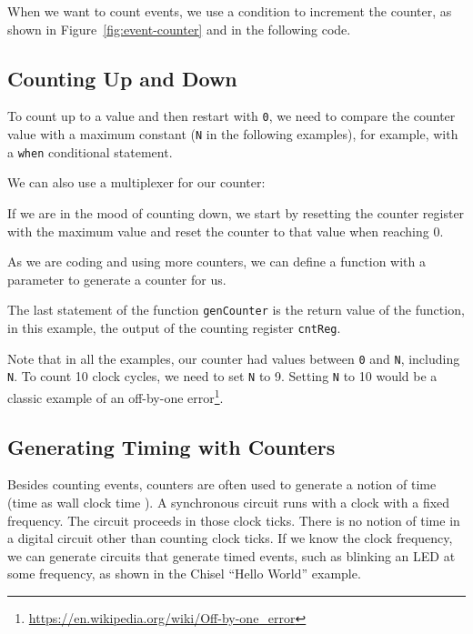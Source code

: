 \documentclass[%
    10pt,
    headinclude, footinclude=false,
    openright, %
    notitlepage,
    cleardoublepage=empty,
    headsepline,
    numbers=noenddot,
    bibliography=totoc, index=totoc,
    ]{scrbook}
\newcommand{\code}[1]{{\lstinline[basicstyle=\small\ttfamily]{#1}}}
\newcommand{\myref}[2]{\href{#1}{#2}}
\renewcommand{\myref}[2]{{#2}{\footnote{\url{#1}}}}
\begin{document}
\noindent When we want to count events, we use a condition to increment the counter,
as shown in Figure~\ref{fig:event-counter} and in the following code.


\subsection{Counting Up and Down}

To count up to a value and then restart with \code{0}, we need to compare
the counter value with a maximum constant (\code{N} in the following examples),
for example, with a \code{when} conditional statement.


\noindent We can also use a multiplexer for our counter:


\noindent If we are in the mood of counting down, we start by resetting the counter register
with the maximum value and reset the counter to that value when reaching 0.


\noindent As we are coding and using more counters, we can
define a function with a parameter to generate a counter for us.


\noindent The last statement of the function \code{genCounter} is the return
value of the function, in this example, the output of
the counting register \code{cntReg}.

Note that in all the examples, our counter had values between \code{0} and
\code{N}, including \code{N}. To count 10 clock cycles, we need
to set \code{N} to 9. Setting \code{N} to 10 would be a classic example of an
\myref{https://en.wikipedia.org/wiki/Off-by-one_error}{off-by-one error}.

\subsection{Generating Timing with Counters}
\label{sec:gen:timing}


Besides counting events, counters are often used to generate a notion of time
(time as wall clock time ).
A synchronous circuit runs with a clock with a fixed frequency.
The circuit proceeds in those clock ticks. There is no notion of time in a digital
circuit other than counting clock ticks. If we know the clock frequency, we
can generate circuits that generate timed events, such as blinking an LED
at some frequency, as shown in the Chisel ``Hello World'' example.
\end{document}
